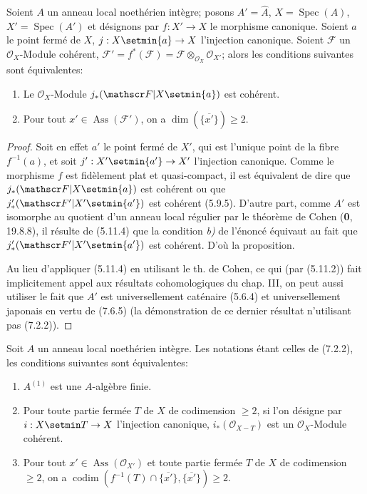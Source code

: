 \begin{proposition}[7.2.2]
\label{IV.2.s7.2.2-fr}
Soient $A$ un anneau local noethérien intègre; posons $A'=\widehat A$,
$X=\operatorname{Spec}(A)$, $X'=\operatorname{Spec}(A')$ et désignons par
$f:X'\to X$ le morphisme canonique. Soient $a$ le point fermé de $X$,
$j:X\setmin\{a\}\to X$ l'injection canonique. Soient $\mathscr F$ un
$\mathscr O_X$-Module cohérent,
$\mathscr F'=f^*(\mathscr F)=\mathscr F\otimes_{\mathscr O_X}\mathscr O_{X'}$;
alors les conditions suivantes sont équivalentes:
\begin{enumerate}
\item[\textup{a)}] Le $\mathscr O_X$-Module
$j_*(\mathscr F|X\setmin\{a\})$ est cohérent.
\item[\textup{b)}] Pour tout $x'\in\operatorname{Ass}(\mathscr F')$, on a
$\dim(\overline{\{x'\}})\geqslant2$.
\end{enumerate}
\end{proposition}

\begin{proof}
Soit en effet $a'$ le point fermé de $X'$, qui est l'unique point de la
fibre $f^{-1}(a)$, et soit $j':X'\setmin\{a'\}\to X'$ l'injection canonique.
Comme le morphisme $f$ est fidèlement plat et quasi-compact, il est
équivalent de dire que $j_*(\mathscr F|X\setmin\{a\})$ est cohérent ou que
$j'_*(\mathscr F'|X'\setmin\{a'\})$ est cohérent (5.9.5). D'autre part, comme
$A'$ est isomorphe au quotient d'un anneau local régulier par le théorème de
Cohen (\textbf{0}, 19.8.8), il résulte de (5.11.4) que la condition \emph{b)} de l'énoncé
équivaut au fait que $j'_*(\mathscr F'|X'\setmin\{a'\})$ est cohérent. D'où la
proposition.

Au lieu d'appliquer (5.11.4) en utilisant le th. de Cohen, ce qui (par
(5.11.2)) fait implicitement appel aux résultats cohomologiques du chap.
III, on peut aussi utiliser le fait que $A'$ est universellement caténaire
(5.6.4) et universellement japonais en vertu de (7.6.5) (la démonstration de
ce dernier résultat n'utilisant pas (7.2.2)).
\end{proof}

\begin{proposition}[7.2.3]
\label{IV.2.s7.2.3-fr}
Soit $A$ un anneau local noethérien intègre. Les notations étant celles de
\textup{(7.2.2)}, les conditions suivantes sont équivalentes:
\begin{enumerate}
\item[\textup{a)}] $A^{(1)}$ est une $A$-algèbre finie.
\item[\textup{b)}] Pour toute partie fermée $T$ de $X$ de codimension $\geqslant2$,
si l'on désigne par $i:X\setmin T\to X$ l'injection canonique,
$i_*(\mathscr O_{X-T})$ est un $\mathscr O_X$-Module cohérent.
\item[\textup{c)}] Pour tout $x'\in\operatorname{Ass}(\mathscr O_{X'})$ et toute
partie fermée $T$ de $X$ de codimension $\geqslant2$, on a
$\operatorname{codim}(f^{-1}(T)\cap\overline{\{x'\}},
\overline{\{x'\}})\geqslant2$.
\end{enumerate}
\end{proposition}

